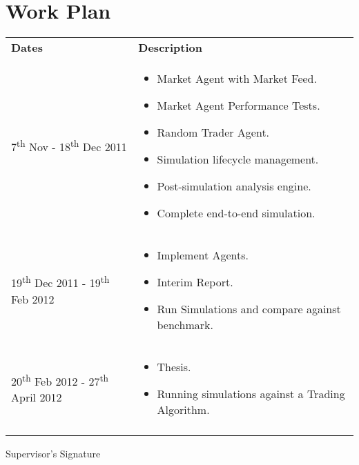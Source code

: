\documentclass[10pt,a4paper]{article}
\begin{document}
\section*{Work Plan}
\begin{tabular}{ p{1.6in} p{3in} }

        \toprule
        
        \multicolumn{1}{l}{\textbf{Dates}}                               		 &
        \multicolumn{1}{l}{\textbf{Description}}                                \\
        
        7\textsuperscript{th} Nov - 18\textsuperscript{th} Dec 2011 &
        
        \begin{itemize}
        \item Market Agent with Market Feed.
        \item Market Agent Performance Tests.
        \item Random Trader Agent.
        \item Simulation lifecycle management.
        \item Post-simulation analysis engine.
        \item Complete end-to-end simulation.
        \end{itemize}                             \\

        19\textsuperscript{th} Dec 2011 - 19\textsuperscript{th} Feb 2012 &
        \begin{itemize}
        \item Implement Agents.
        \item Interim Report.
        \item Run Simulations and compare against benchmark.
        \end{itemize}
        \\
        
        20\textsuperscript{th} Feb 2012 - 27\textsuperscript{th} April 2012 &
        \begin{itemize}
        \item Thesis.
        \item Running simulations against a Trading Algorithm.
        \end{itemize}
        \\
        
        \bottomrule
        
        \\[1in]
        
\end{tabular}

\begin{flushright}
Supervisor's Signature\hspace{0.5cm} \makebox[1.5in]{\hrulefill}
\end{flushright}
\end{document}

